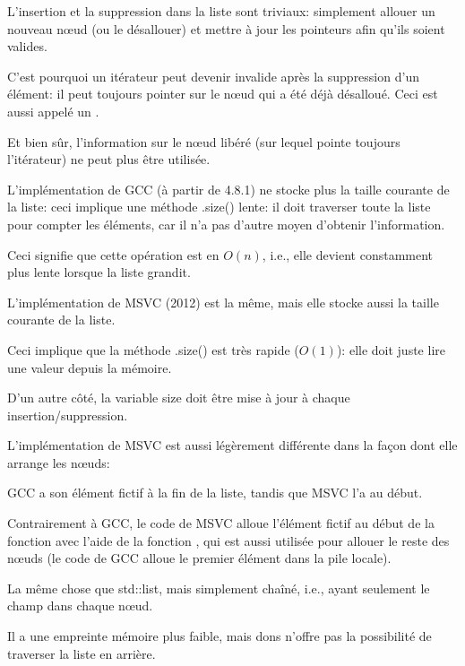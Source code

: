 L'insertion et la suppression dans la liste sont triviaux: simplement allouer un nouveau
n\oe{}ud (ou le désallouer) et mettre à jour les pointeurs afin qu'ils soient valides.

C'est pourquoi un itérateur peut devenir invalide après la suppression d'un élément:
il peut toujours pointer sur le n\oe{}ud qui a été déjà désalloué.
Ceci est aussi appelé un .

Et bien sûr, l'information sur le n\oe{}ud libéré (sur lequel pointe toujours l'itérateur)
ne peut plus être utilisée.

L'implémentation de GCC (à partir de 4.8.1) ne stocke plus la taille courante de
la liste: ceci implique une méthode .size() lente: il doit traverser toute la liste
pour compter les éléments, car il n'a pas d'autre moyen d'obtenir l'information.

Ceci signifie que cette opération est en $O(n)$, i.e., elle devient constamment plus
lente lorsque la liste grandit.





\label{MSVC_std_list}

L'implémentation de MSVC (2012) est la même, mais elle stocke aussi la taille courante
de la liste.

Ceci implique que la méthode .size() est très rapide ($O(1)$): elle doit juste lire
une valeur depuis la mémoire.

D'un autre côté, la variable size doit être mise à jour à chaque insertion/suppression.

L'implémentation de MSVC est aussi légèrement différente dans la façon dont elle
arrange les n\oe{}uds:



GCC a son élément fictif à la fin de la liste, tandis que MSVC l'a au début.



Contrairement à GCC, le code de MSVC alloue l'élément fictif au début de la fonction
avec l'aide de la fonction , qui est aussi utilisée pour allouer le reste
des n\oe{}uds (le code de GCC alloue le premier élément dans la pile locale).




La même chose que std::list, mais simplement chaîné, i.e., ayant seulement le champ
 dans chaque n\oe{}ud.

Il a une empreinte mémoire plus faible, mais dons n'offre pas la possibilité de
traverser la liste en arrière.
